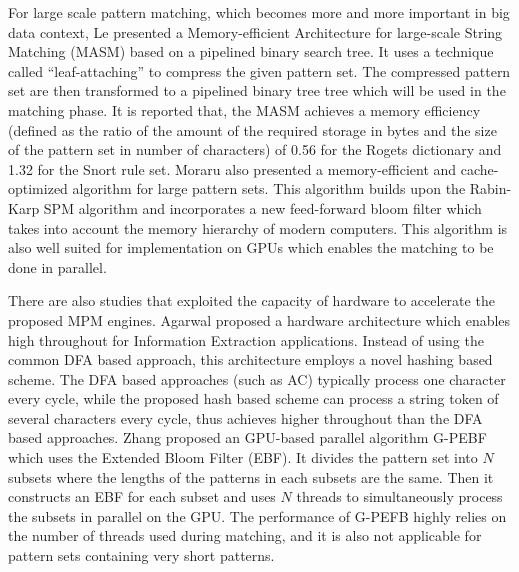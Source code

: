 \documentclass{article}
\begin{document}
For large scale pattern matching, which becomes more and more
important in big data context, Le \cite{Le2013} presented a
Memory-efficient Architecture for large-scale String Matching
(\textsf{MASM}) based on a pipelined binary search tree. It uses a
technique called ``leaf-attaching'' to compress the given pattern
set. The compressed pattern set are then transformed to a pipelined
binary tree tree which will be used in the matching phase. It is
reported that, the \textsf{MASM} achieves a memory efficiency (defined
as the ratio of the amount of the required storage in bytes and the
size of the pattern set in number of characters) of 0.56 for the
Rogets dictionary and 1.32 for the Snort rule set. Moraru
\cite{Moraru2012} also presented a memory-efficient and
cache-optimized algorithm for large pattern sets. This algorithm
builds upon the Rabin-Karp \cite{Karp1987} SPM algorithm and
incorporates a new \textsf{feed-forward} bloom filter which takes into
account the memory hierarchy of modern computers. This algorithm is
also well suited for implementation on GPUs which enables the matching
to be done in parallel.

There are also studies that exploited the capacity of hardware to
accelerate the proposed MPM engines. Agarwal \cite{Agarwal2013}
proposed a hardware architecture which enables high throughout for
Information Extraction applications. Instead of using the common DFA
based approach, this architecture employs a novel hashing based
scheme. The DFA based approaches (such as \textsf{AC}) typically
process one character every cycle, while the proposed hash based
scheme can process a string token of several characters every cycle,
thus achieves higher throughout than the DFA based approaches. Zhang
\cite{Zhang2015} proposed an GPU-based parallel algorithm
\textsf{G-PEBF} which uses the Extended Bloom Filter (EBF). It divides
the pattern set into $N$ subsets where the lengths of the patterns in
each subsets are the same. Then it constructs an EBF for each subset
and uses $N$ threads to simultaneously process the subsets in parallel
on the GPU. The performance of \textsf{G-PEFB} highly relies on the
number of threads used during matching, and it is also not applicable
for pattern sets containing very short patterns.
\end{document}
